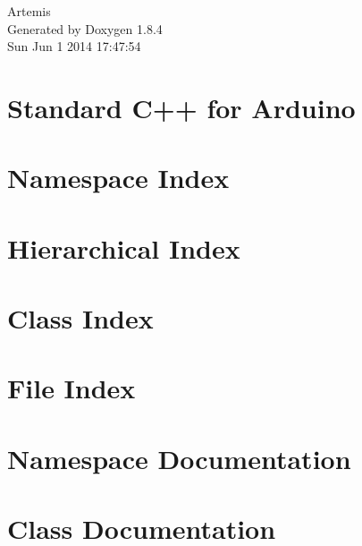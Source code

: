 \documentclass[twoside]{book}
\newcommand{\clearemptydoublepage}{%
  \newpage{\pagestyle{empty}\cleardoublepage}%
}
\begin{document}
\hypersetup{pageanchor=false}
\begin{titlepage}
\vspace*{7cm}
\begin{center}%
{\Large Artemis }\\
\vspace*{1cm}
{\large Generated by Doxygen 1.8.4}\\
\vspace*{0.5cm}
{\small Sun Jun 1 2014 17:47:54}\\
\end{center}
\end{titlepage}
\clearemptydoublepage
\tableofcontents
\clearemptydoublepage
{}
\hypersetup{pageanchor=true}

\chapter{Standard C++ for Arduino}
\label{md_lib_avr-stl_README}
\hypertarget{md_lib_avr-stl_README}{}

\chapter{Namespace Index}

\chapter{Hierarchical Index}

\chapter{Class Index}

\chapter{File Index}

\chapter{Namespace Documentation}


\chapter{Class Documentation}






















\end{document}
